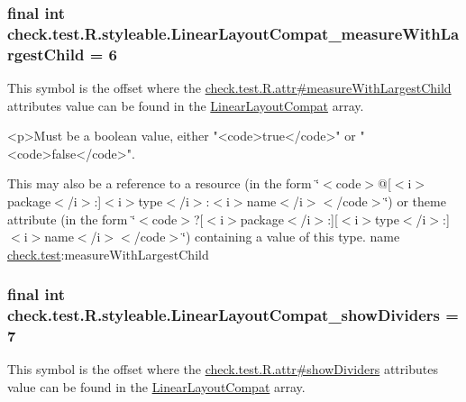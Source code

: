\subsubsection[{Linear\+Layout\+Compat\+\_\+measure\+With\+Largest\+Child}]{\setlength{\rightskip}{0pt plus 5cm}final int check.\+test.\+R.\+styleable.\+Linear\+Layout\+Compat\+\_\+measure\+With\+Largest\+Child = 6\hspace{0.3cm}{\ttfamily [static]}}\label{classcheck_1_1test_1_1_r_1_1styleable_a68068887a622f9abc4411ad0205c6676}
This symbol is the offset where the \hyperlink{classcheck_1_1test_1_1_r_1_1attr_a48262f79fe5c9e5f34747792592c3f00}{check.\+test.\+R.\+attr\#measure\+With\+Largest\+Child} attribute\textquotesingle{}s value can be found in the \hyperlink{classcheck_1_1test_1_1_r_1_1styleable_a1cee5a37a541e5cb360983f35ebfe0fc}{Linear\+Layout\+Compat} array.

\begin{DoxyVerb}      <p>Must be a boolean value, either "<code>true</code>" or "<code>false</code>".
\end{DoxyVerb}
 

This may also be a reference to a resource (in the form \char`\"{}$<$code$>$@\mbox{[}$<$i$>$package$<$/i$>$\+:\mbox{]}$<$i$>$type$<$/i$>$\+:$<$i$>$name$<$/i$>$$<$/code$>$\char`\"{}) or theme attribute (in the form \char`\"{}$<$code$>$?\mbox{[}$<$i$>$package$<$/i$>$\+:\mbox{]}\mbox{[}$<$i$>$type$<$/i$>$\+:\mbox{]}$<$i$>$name$<$/i$>$$<$/code$>$\char`\"{}) containing a value of this type.  name \hyperlink{namespacecheck_1_1test}{check.\+test}\+:measure\+With\+Largest\+Child \hypertarget{classcheck_1_1test_1_1_r_1_1styleable_a71cd3612e1f50bfb49a67c1415778854}{}
\subsubsection[{Linear\+Layout\+Compat\+\_\+show\+Dividers}]{\setlength{\rightskip}{0pt plus 5cm}final int check.\+test.\+R.\+styleable.\+Linear\+Layout\+Compat\+\_\+show\+Dividers = 7\hspace{0.3cm}{\ttfamily [static]}}\label{classcheck_1_1test_1_1_r_1_1styleable_a71cd3612e1f50bfb49a67c1415778854}
This symbol is the offset where the \hyperlink{classcheck_1_1test_1_1_r_1_1attr_a750aa097ff8cb566f4d3df74241890b9}{check.\+test.\+R.\+attr\#show\+Dividers} attribute\textquotesingle{}s value can be found in the \hyperlink{classcheck_1_1test_1_1_r_1_1styleable_a1cee5a37a541e5cb360983f35ebfe0fc}{Linear\+Layout\+Compat} array.

